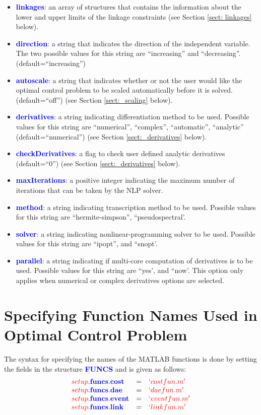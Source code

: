 \documentclass[10pt,final]{report}
\newcommand{\bfblue}[1]{\textcolor{blue}{\bf #1}}
\newcommand{\slred}[1]{\textcolor{red}{\sl #1}}
\begin{document}
\begin{itemize}
\item \bfblue{linkages}: an array of structures that contains the
  information about the lower and upper limits of the linkage constraints (see Section \ref{sect: linkages} below).
\item \bfblue{direction}:  a string that indicates the direction of
  the independent variable.  The two possible values for this string
  are ``increasing'' and ``decreasing''. (default=``increasing'')
\item \bfblue{autoscale}: a string that indicates whether or not
  the user would like the optimal control problem to be scaled
  automatically before it is solved. (default=``off'') (see Section \ref{sect:_scaling} below).
\item \bfblue{derivatives}:  a string indicating differentiation method to be used.  Possible values for this   string are ``numerical'', ``complex'', ``automatic'', ``analytic'' (default=``numerical'') (see Section \ref{sect:_derivatives} below).
\item \bfblue{checkDerivatives}: a flag to check user defined analytic derivatives (default=``0'') (see Section \ref{sect:_derivatives} below).
\item \bfblue{maxIterations}:  a positive integer indicating the maximum number of iterations that can be taken by the NLP solver.  
\item \bfblue{method}:   a string indicating transcription method to be used. Possible values for this string are ``hermite-simpson'', ``pseudospectral'.
\item \bfblue{solver}:   a string indicating nonlinear-programming solver to be used. Possible values for this string are ``ipopt'', and ``snopt'.
\item \bfblue{parallel}:   a string indicating if multi-core computation of derivatives is to be used. Possible values for this string are ``yes', and ``now'. This option only applies when numerical or complex derivatives options are selected.
\end{itemize}

\section{Specifying Function Names Used in Optimal Control Problem}\label{sect:_Func_Names}

The syntax for specifying the names of the MATLAB functions is done by
setting the fields in the structure \bfblue{FUNCS} and is given as follows:
\begin{displaymath}
  \begin{array}{lcl}
    \slred{setup}.\bfblue{funcs.cost} & = & \slred{`costfun.m'} \\
    \slred{setup}.\bfblue{funcs.dae} & = & \slred{`daefun.m'} \\
    \slred{setup}.\bfblue{funcs.event} & = & \slred{`eventfun.m'} \\
    \slred{setup}.\bfblue{funcs.link} & = & \slred{`linkfun.m'}
  \end{array}
\end{displaymath}
\end{document}
